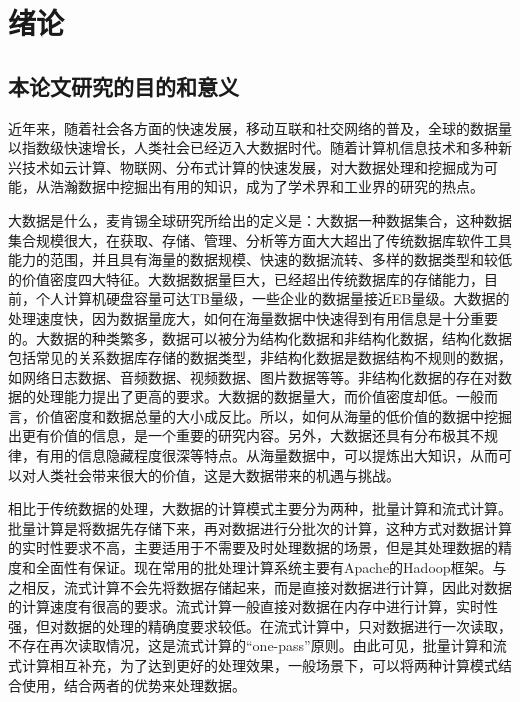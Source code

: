 \chapter{绪论}
\label{chap:intro}
\section{本论文研究的目的和意义}

近年来，随着社会各方面的快速发展，移动互联和社交网络的普及，全球的数据量以指数级快速增长，人类社会已经迈入大数据时代。随着计算机信息技术和多种新兴技术如云计算、物联网、分布式计算的快速发展，对大数据处理和挖掘成为可能，从浩瀚数据中挖掘出有用的知识，成为了学术界和工业界的研究的热点。

大数据是什么，麦肯锡全球研究所给出的定义是：大数据一种数据集合，这种数据集合规模很大，在获取、存储、管理、分析等方面大大超出了传统数据库软件工具能力的范围，并且具有海量的数据规模、快速的数据流转、多样的数据类型和较低的价值密度四大特征。大数据数据量巨大，已经超出传统数据库的存储能力，目前，个人计算机硬盘容量可达TB量级，一些企业的数据量接近EB量级。大数据的处理速度快，因为数据量庞大，如何在海量数据中快速得到有用信息是十分重要的。大数据的种类繁多，数据可以被分为结构化数据和非结构化数据，结构化数据包括常见的关系数据库存储的数据类型，非结构化数据是数据结构不规则的数据，如网络日志数据、音频数据、视频数据、图片数据等等。非结构化数据的存在对数据的处理能力提出了更高的要求。大数据的数据量大，而价值密度却低。一般而言，价值密度和数据总量的大小成反比。所以，如何从海量的低价值的数据中挖掘出更有价值的信息，是一个重要的研究内容。另外，大数据还具有分布极其不规律，有用的信息隐藏程度很深等特点。从海量数据中，可以提炼出大知识，从而可以对人类社会带来很大的价值，这是大数据带来的机遇与挑战。

相比于传统数据的处理，大数据的计算模式主要分为两种，批量计算和流式计算。批量计算是将数据先存储下来，再对数据进行分批次的计算，这种方式对数据计算的实时性要求不高，主要适用于不需要及时处理数据的场景，但是其处理数据的精度和全面性有保证。现在常用的批处理计算系统主要有Apache的Hadoop框架。与之相反，流式计算不会先将数据存储起来，而是直接对数据进行计算，因此对数据的计算速度有很高的要求。流式计算一般直接对数据在内存中进行计算，实时性强，但对数据的处理的精确度要求较低。在流式计算中，只对数据进行一次读取，不存在再次读取情况，这是流式计算的“one-pass”原则。由此可见，批量计算和流式计算相互补充，为了达到更好的处理效果，一般场景下，可以将两种计算模式结合使用，结合两者的优势来处理数据。


